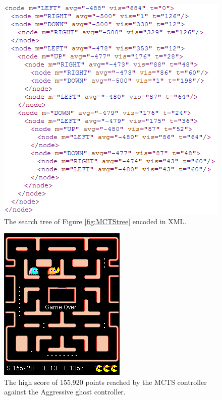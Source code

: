\documentclass[conference]{IEEEtran}
\begin{document}
\begin{figure}[!htb]
\centering
\includegraphics[scale=.6]{xml.png}
\caption{The search tree of Figure \ref{fig:MCTStree} encoded in XML.}
\label{fig:EASHORTC}
\end{figure}

\begin{figure}[!htb]
\centering
\includegraphics[scale=.6]{155920.png}
\caption{The high score of 155,920 points reached by the MCTS controller against the Aggressive ghost controller.}
\label{fig:MCTShighscore}
\end{figure}
\end{document}
